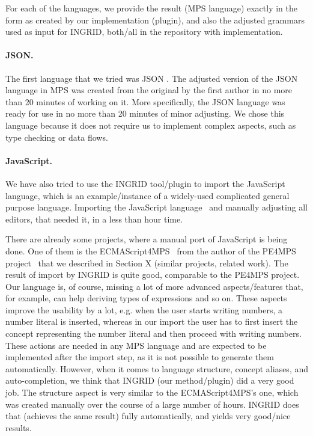 For each of the languages, we provide the result (MPS language) exactly in the form as created by our implementation (plugin), and also the adjusted grammars used as input for INGRID, both/all in the repository with implementation.

\paragraph{JSON.}
The first language that we tried was JSON .
The adjusted version of the JSON language in MPS was created from the original by the first author in no more than 20 minutes of working on it.
More specifically, the JSON language was ready for use in no more than 20 minutes of minor adjusting.
We chose this language because it does not require us to implement complex aspects, such as type checking or data flows.

\paragraph{JavaScript.}
We have also tried to use the INGRID tool/plugin to import the JavaScript language, which is an example/instance of a widely-used complicated general purpose language.
Importing the JavaScript language~\cite{ref:javascript} and manually adjusting all editors, that needed it, in a less than hour time.

There are already some projects, where a manual port of JavaScript is being done.
One of them is the ECMAScript4MPS~\cite{ref:ECMAScript4MPS} from the author of the PE4MPS project~\cite{ref:PE4MPS} that we described in Section X (similar projects, related work).
The result of import by INGRID is quite good, comparable to the PE4MPS project.
Our language is, of course, missing a lot of more advanced aspects/features that, for example, can help deriving types of expressions and so on.
These aspects improve the usability by a lot, e.g. when the user starts writing numbers, a number literal is inserted, whereas in our import the user has to first insert the concept representing the number literal and then proceed with writing numbers.
These actions are needed in any MPS language and are expected to be implemented after the import step,  as it is not possible to generate them automatically.
However, when it comes to language structure, concept aliases, and auto-completion, we think that INGRID (our method/plugin) did a very good job.
The structure aspect is very similar to the ECMAScript4MPS's one, which was created manually over the course of a large number of hours.
INGRID does that (achieves the same result) fully automatically, and yields very good/nice results.

